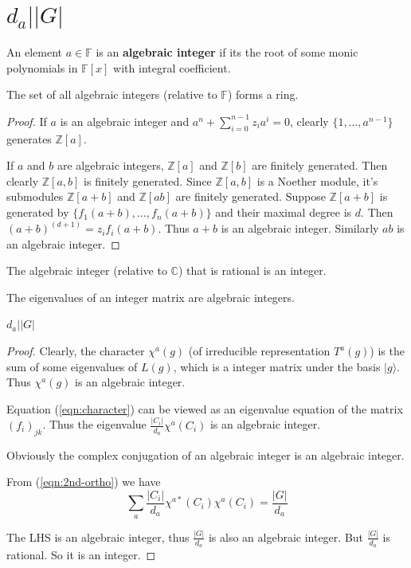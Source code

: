 \documentclass[12pt]{book}
\begin{document}
	\section{$d_a\big||G|$}
	\begin{definition}
		An element $a\in\mathbb F$ is an \textbf{algebraic integer} if its the root of some monic polynomials in $\mathbb F[x]$ with integral coefficient.	
	\end{definition}

	\begin{theorem}
		The set of all algebraic integers (relative to $\mathbb F$) forms a ring.
	\end{theorem}
	\begin{proof}
		If $a$ is an algebraic integer and $a^n+\sum_{i=0}^{n-1}z_ia^i=0$, clearly $\{1,\dots,a^{n-1}\}$ generates $\mathbb Z[a]$.
		
		If $a$ and $b$ are algebraic integers, $\mathbb Z[a]$ and $\mathbb Z[b]$ are finitely generated. Then clearly $\mathbb Z[a,b]$ is finitely generated. Since $\mathbb Z[a,b]$ is a Noether module, it's submodules $\mathbb Z[a+b]$ and $\mathbb Z[ab]$ are finitely generated. Suppose $\mathbb Z[a+b]$ is generated by $\{f_1(a+b),\dots,f_n(a+b)\}$ and their maximal degree is $d$. Then $(a+b)^{(d+1)}=z_if_i(a+b)$. Thus $a+b$ is an algebraic integer. Similarly $ab$ is an algebraic integer.
	\end{proof}	
	\begin{theorem}
		The algebraic integer (relative to $\mathbb C$) that is rational is an integer.
	\end{theorem}
	\begin{theorem}
		The eigenvalues of an integer matrix are algebraic integers.
	\end{theorem}
	
	\begin{theorem}
		$d_a\big||G|$
	\end{theorem}
	\begin{proof}
	Clearly, the character $\chi^a(g)$ (of irreducible representation $T^a(g)$) is the sum of some eigenvalues of $L(g)$, which is a integer matrix under the basis $|g\rangle$. Thus $\chi^a(g)$ is an algebraic integer.
	
	Equation (\ref{eqn:character}) can be viewed as an eigenvalue equation of the matrix $(f_i)_{jk}$. Thus the eigenvalue $\frac{|C_i|}{d_a}\chi^a(C_i)$ is an algebraic integer.
	
	Obviously the complex conjugation of an algebraic integer is an algebraic integer.
	
	From (\ref{eqn:2nd-ortho}) we have
	\begin{equation}
	\sum_a\frac{|C_i|}{d_a}\chi^{a*}(C_i)\chi^a(C_i)=\frac{|G|}{d_a}
	\end{equation}
	
	The LHS is an algebraic integer, thus $\frac{|G|}{d_a}$ is also an algebraic integer. But $\frac{|G|}{d_a}$ is rational. So it is an integer.	
	\end{proof}
	
\end{document}
